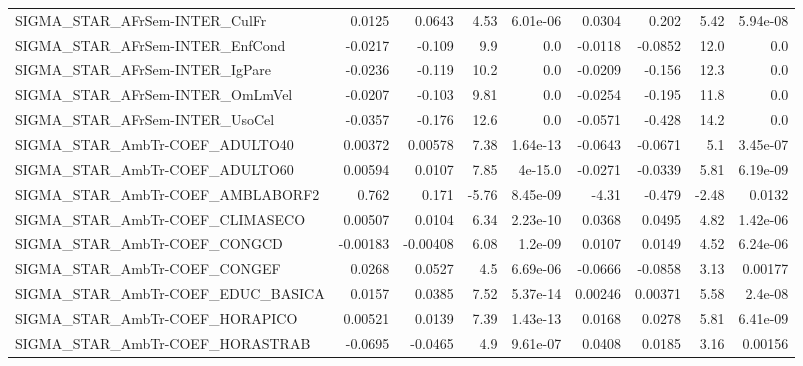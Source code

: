 \begin{tabular}{lrrrrrrrr}
SIGMA\_STAR\_AFrSem-INTER\_CulFr         &      0.0125 &       0.0643 &     4.53 & 6.01e-06 &     0.0304 &       0.202 &         5.42 &      5.94e-08 \\
SIGMA\_STAR\_AFrSem-INTER\_EnfCond       &     -0.0217 &       -0.109 &      9.9 &      0.0 &    -0.0118 &     -0.0852 &         12.0 &           0.0 \\
SIGMA\_STAR\_AFrSem-INTER\_IgPare        &     -0.0236 &       -0.119 &     10.2 &      0.0 &    -0.0209 &      -0.156 &         12.3 &           0.0 \\
SIGMA\_STAR\_AFrSem-INTER\_OmLmVel       &     -0.0207 &       -0.103 &     9.81 &      0.0 &    -0.0254 &      -0.195 &         11.8 &           0.0 \\
SIGMA\_STAR\_AFrSem-INTER\_UsoCel        &     -0.0357 &       -0.176 &     12.6 &      0.0 &    -0.0571 &      -0.428 &         14.2 &           0.0 \\
SIGMA\_STAR\_AmbTr-COEF\_ADULTO40        &     0.00372 &      0.00578 &     7.38 & 1.64e-13 &    -0.0643 &     -0.0671 &          5.1 &      3.45e-07 \\
SIGMA\_STAR\_AmbTr-COEF\_ADULTO60        &     0.00594 &       0.0107 &     7.85 &  4e-15.0 &    -0.0271 &     -0.0339 &         5.81 &      6.19e-09 \\
SIGMA\_STAR\_AmbTr-COEF\_AMBLABORF2      &       0.762 &        0.171 &    -5.76 & 8.45e-09 &      -4.31 &      -0.479 &        -2.48 &        0.0132 \\
SIGMA\_STAR\_AmbTr-COEF\_CLIMASECO       &     0.00507 &       0.0104 &     6.34 & 2.23e-10 &     0.0368 &      0.0495 &         4.82 &      1.42e-06 \\
SIGMA\_STAR\_AmbTr-COEF\_CONGCD          &    -0.00183 &     -0.00408 &     6.08 &  1.2e-09 &     0.0107 &      0.0149 &         4.52 &      6.24e-06 \\
SIGMA\_STAR\_AmbTr-COEF\_CONGEF          &      0.0268 &       0.0527 &      4.5 & 6.69e-06 &    -0.0666 &     -0.0858 &         3.13 &       0.00177 \\
SIGMA\_STAR\_AmbTr-COEF\_EDUC\_BASICA     &      0.0157 &       0.0385 &     7.52 & 5.37e-14 &    0.00246 &     0.00371 &         5.58 &       2.4e-08 \\
SIGMA\_STAR\_AmbTr-COEF\_HORAPICO        &     0.00521 &       0.0139 &     7.39 & 1.43e-13 &     0.0168 &      0.0278 &         5.81 &      6.41e-09 \\
SIGMA\_STAR\_AmbTr-COEF\_HORASTRAB       &     -0.0695 &      -0.0465 &      4.9 & 9.61e-07 &     0.0408 &      0.0185 &         3.16 &       0.00156 \\

\end{tabular}

